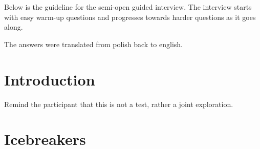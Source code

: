 

Below is the guideline for the semi-open guided interview. 
The interview starts with easy warm-up questions and progresses towards harder questions as it goes along. 

The answers were translated from polish back to english.

\section{Introduction}
Remind the participant that this is not a test, rather a joint exploration.

\section{Icebreakers}

